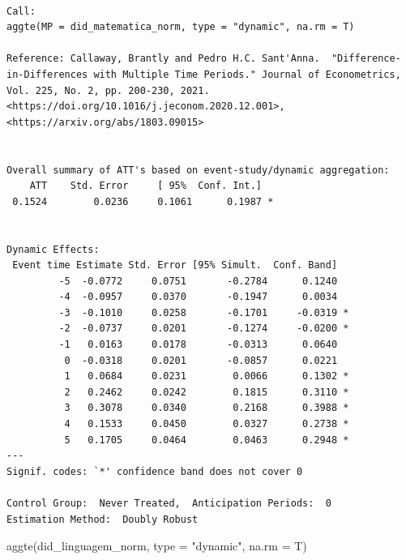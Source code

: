 \documentclass[
  letterpaper,
  DIV=11,
  numbers=noendperiod]{scrartcl}
\newenvironment{Shaded}{\begin{snugshade}}{\end{snugshade}}
\newcommand{\AttributeTok}[1]{\textcolor[rgb]{0.40,0.45,0.13}{#1}}
\newcommand{\FunctionTok}[1]{\textcolor[rgb]{0.28,0.35,0.67}{#1}}
\newcommand{\NormalTok}[1]{\textcolor[rgb]{0.00,0.23,0.31}{#1}}
\newcommand{\StringTok}[1]{\textcolor[rgb]{0.13,0.47,0.30}{#1}}
\begin{document}
\begin{verbatim}

Call:
aggte(MP = did_matematica_norm, type = "dynamic", na.rm = T)

Reference: Callaway, Brantly and Pedro H.C. Sant'Anna.  "Difference-in-Differences with Multiple Time Periods." Journal of Econometrics, Vol. 225, No. 2, pp. 200-230, 2021. <https://doi.org/10.1016/j.jeconom.2020.12.001>, <https://arxiv.org/abs/1803.09015> 


Overall summary of ATT's based on event-study/dynamic aggregation:  
    ATT    Std. Error     [ 95%  Conf. Int.]  
 0.1524        0.0236     0.1061      0.1987 *


Dynamic Effects:
 Event time Estimate Std. Error [95% Simult.  Conf. Band]  
         -5  -0.0772     0.0751       -0.2784      0.1240  
         -4  -0.0957     0.0370       -0.1947      0.0034  
         -3  -0.1010     0.0258       -0.1701     -0.0319 *
         -2  -0.0737     0.0201       -0.1274     -0.0200 *
         -1   0.0163     0.0178       -0.0313      0.0640  
          0  -0.0318     0.0201       -0.0857      0.0221  
          1   0.0684     0.0231        0.0066      0.1302 *
          2   0.2462     0.0242        0.1815      0.3110 *
          3   0.3078     0.0340        0.2168      0.3988 *
          4   0.1533     0.0450        0.0327      0.2738 *
          5   0.1705     0.0464        0.0463      0.2948 *
---
Signif. codes: `*' confidence band does not cover 0

Control Group:  Never Treated,  Anticipation Periods:  0
Estimation Method:  Doubly Robust
\end{verbatim}

\begin{Shaded}
\begin{Highlighting}[]
\FunctionTok{aggte}\NormalTok{(did\_linguagem\_norm, }\AttributeTok{type =} \StringTok{"dynamic"}\NormalTok{, }\AttributeTok{na.rm =}\NormalTok{ T)}
\end{Highlighting}
\end{Shaded}
\end{document}
